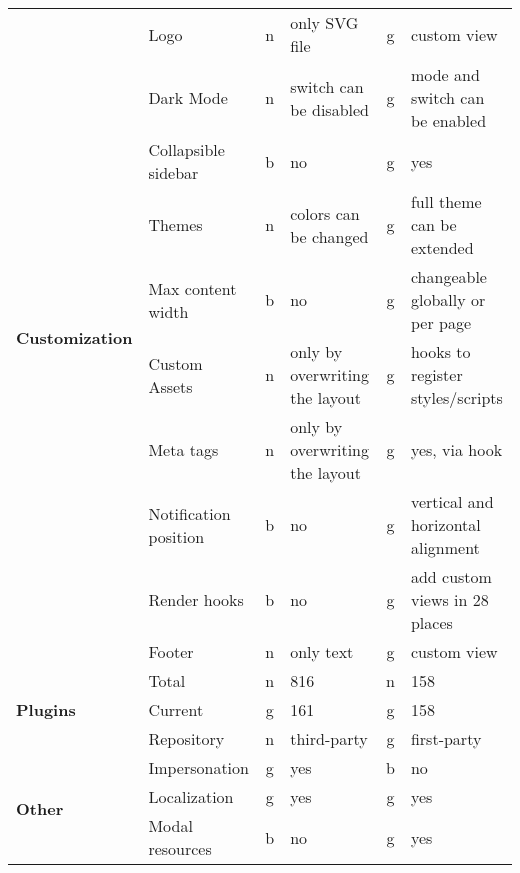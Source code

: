 \begin{table}[]
{\begin{tabular}{llclcl}
            \multirow{10}{*}{\textbf{Customization}} & Logo                   & n           & only SVG file                   & g           & custom view                              \\
            & Dark Mode              & n           & switch can be disabled          & g           & mode and switch can be enabled           \\
            & Collapsible sidebar    & b           & no                              & g           & yes                                      \\
            & Themes                 & n           & colors can be changed           & g           & full theme can be extended               \\
            & Max content width      & b           & no                              & g           & changeable globally or per page          \\
            & Custom Assets          & n           & only by overwriting the layout  & g           & hooks to register styles/scripts         \\
            & Meta tags              & n           & only by overwriting the layout  & g           & yes, via hook                            \\
            & Notification position  & b           & no                              & g           & vertical and horizontal alignment        \\
            & Render hooks           & b           & no                              & g           & add custom views in 28 places            \\
            & Footer                 & n           & only text                       & g           & custom view                              \\
            \hline
            \multirow{3}{*}{\textbf{Plugins}}        & Total                  & n           & 816                             & n           & 158                                      \\
            & Current                & g           & 161                             & g           & 158                                      \\
            & Repository             & n           & third-party                     & g           & first-party                              \\
            \hline
            \multirow{3}{*}{\textbf{Other}}          & Impersonation          & g           & yes                             & b           & no                                       \\
            & Localization           & g           & yes                             & g           & yes                                      \\
            & Modal resources        & b           & no                              & g           & yes
        \end{tabular}%
    }
\end{table}
